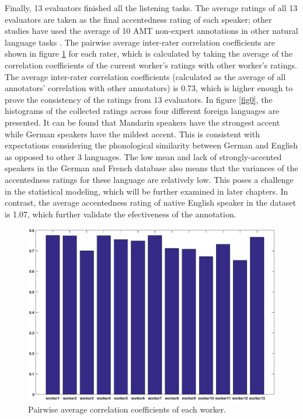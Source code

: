 Finally, 13 evaluators finished all the listening tasks. The average ratings of all 13 evaluators are taken as the final accentedness rating of each speaker; other studies have used the average of 10 AMT non-expert annotations in other natural language tasks \citep{snow2008cheap}. The pairwise average inter-rater correlation coefficients are shown in figure \ref{fig:pairwise_corr} for each rater, which is calculated by taking the average of the correlation coefficients of the current worker's ratings with other worker's ratings. The average inter-rater correlation coefficients (calculated as the average of all annotators' correlation with other annotators) is 0.73, which is higher enough to prove the consistency of the ratings from 13 evaluators. In figure \ref{fig0}, the histograms of the collected ratings across four different foreign languages are presented. It can be found that Mandarin speakers have the strongest accent while German speakers have the mildest accent. This is consistent with expectations considering the phonological similarity between German and English as opposed to other 3 languages. The low mean and lack of strongly-accented speakers in the German and French database also means that the variances of the accentedness ratings for these language are relatively low. This poses a challenge in the statistical modeling, which will be further examined in later chapters. In contrast, the average accentedness rating of native English speaker in the dataset is 1.07, which further validate the efectiveness of the annotation.

\begin{figure}[t]
\centering
\captionsetup{justification=centering}
\includegraphics[width = 0.8\linewidth]{figures/mean_pairwise_correlation_without_work4.eps}
\caption{Pairwise average correlation coefficients of each worker.}
\label{fig:pairwise_corr}
\end{figure}

